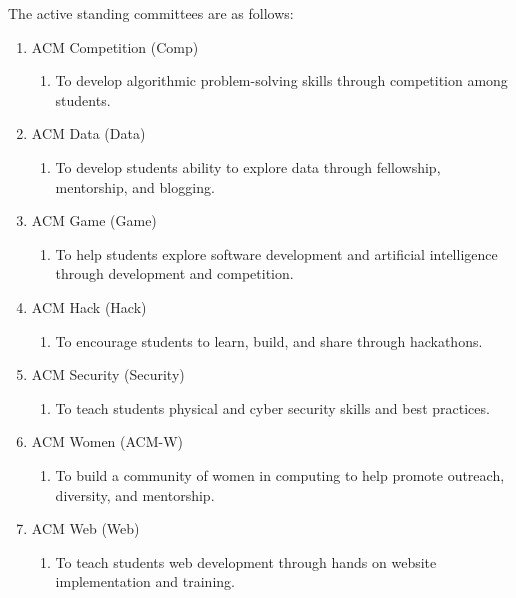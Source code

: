 The active standing committees are as follows:
\begin{enumerate}[nolistsep]
  \item ACM Competition (Comp)
    \begin{enumerate}
      \item To develop algorithmic problem-solving skills through competition
        among students.
    \end{enumerate}
  \item ACM Data (Data)
    \begin{enumerate}
      \item To develop students ability to explore data through fellowship,
        mentorship, and blogging.
    \end{enumerate}
  \item ACM Game (Game)
    \begin{enumerate}
      \item To help students explore software development and artificial
        intelligence through development and competition.
    \end{enumerate}
  \item ACM Hack (Hack)
    \begin{enumerate}
      \item To encourage students to learn, build, and share through
        hackathons.
    \end{enumerate}
  \item ACM Security (Security)
    \begin{enumerate}
      \item To teach students physical and cyber security skills and best
        practices.
    \end{enumerate}
  \item ACM Women (ACM-W)
    \begin{enumerate}
      \item To build a community of women in computing to help promote
        outreach, diversity, and mentorship.
    \end{enumerate}
  \item ACM Web (Web)
    \begin{enumerate}
      \item To teach students web development through hands on website
        implementation and training.
    \end{enumerate}
\end{enumerate}


